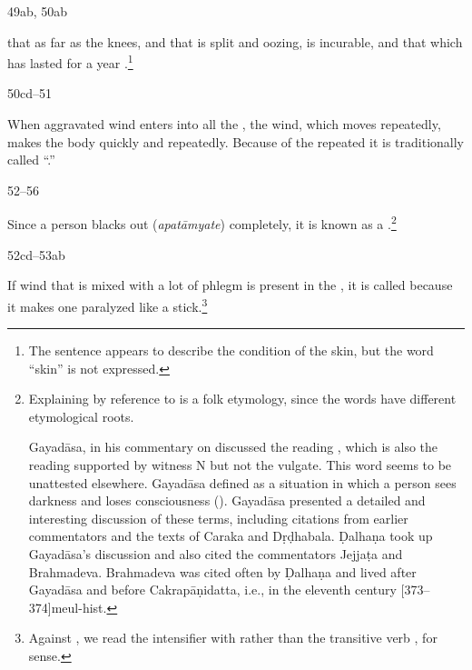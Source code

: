 \begin{translation}
\item[49ab, 50ab]

 that  as far as
the knees, and that is split and oozing, is incurable, and that which
has lasted for a year .\footnote{The
    sentence appears to describe the condition of the skin, but the word
    “skin” is not expressed.}
  

\item[50cd--51]

When aggravated wind enters into all the , the
wind, which moves repeatedly, makes the body 
quickly and repeatedly. Because of the repeated
 it is traditionally called “.”


\item[52--56]

	Since a person blacks out (\emph{apatāmyate}) completely, it is
known as a .\footnote{Explaining  by 
reference to
     is a folk etymology, since the words have different
    etymological roots. 
    
    Gayadāsa, in his commentary on  discussed the
reading , which is also the  reading supported by
witness N but not the vulgate.  This word seems to be unattested
elsewhere.  Gayadāsa defined  as a situation in which
a person sees darkness and loses consciousness (). Gayadāsa presented a detailed and interesting
discussion of these terms, including citations from earlier
commentators and the texts of Caraka and Dṛḍhabala. Ḍalhaṇa took
up Gayadāsa's discussion and also cited the commentators Jejjaṭa
and Brahmadeva. Brahmadeva was cited often by Ḍalhaṇa and lived
after Gayadāsa and before Cakrapāṇidatta, i.e., in the eleventh
century [373--374]{meul-hist}.\label{Brahmadeva}}

\item[52cd--53ab] 

If wind that is mixed with a lot of phlegm is present in
the , it is called  because it makes one paralyzed like a stick.\footnote{Against
    , we read the intensifier  with 
     rather
    than the transitive verb , for sense.
    
}
\end{translation}
